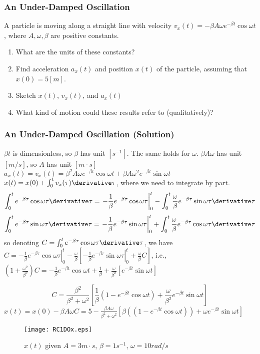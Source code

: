 \begin{frame}
\frametitle{An Under-Damped Oscillation}
A particle is moving along a \alert{straight} line with velocity $v_x(t)=-\beta A\omega e^{-\beta t}\cos\omega t$, where $A,\omega,\beta$ are \alert{positive} constants.
\begin{enumerate}
\item{What are the \alert{units} of these constants?}
\item{Find \alert{acceleration} $a_x(t)$ and \alert{position} $x(t)$ of the particle, assuming that $x(0)=5\unit{[m]}$.}
\item{Sketch $x(t)$, $v_x(t)$, and $a_x(t)$}
\item{What kind of motion could these results refer to (qualitatively)?}
\end{enumerate}
\end{frame}
\begin{frame}
\frametitle{An Under-Damped Oscillation (Solution)}
$\beta t$ is \alert{dimensionless}, so $\beta$ has unit $[s^{-1}]$. The same holds for $\omega$. $\beta A\omega$ has unit $[m/s]$, so $A$ has unit $[m\cdot s]$\\$a_x(t)=\dot v_x(t)=\beta^2 A\omega e^{-\beta t}\cos\omega t+\beta A\omega^2 e^{-\beta t}\sin\omega t$\\$x(t)=x(0)+\int_0^t v_x(\tau)\derivative\tau$, where we need to \alert{integrate by part}.
\[
\int_0^t e^{-\beta \tau}\cos\omega \tau\derivative\tau=\left.-\frac{1}{\beta}e^{-\beta\tau}\cos\omega\tau\right|_0^t-\int_0^t\frac{\omega}{\beta}e^{-\beta\tau}\sin\omega\tau\derivative\tau
\]
\[
\int_0^t e^{-\beta \tau}\sin\omega \tau\derivative\tau=\left.-\frac{1}{\beta}e^{-\beta\tau}\sin\omega\tau\right|_0^t+\int_0^t\frac{\omega}{\beta}e^{-\beta\tau}\cos\omega\tau\derivative\tau
\]
so denoting $C=\int_0^t e^{-\beta \tau}\cos\omega \tau\derivative\tau$, we have $C=\left.-\frac{1}{\beta}e^{-\beta\tau}\cos\omega\tau\right|_0^t-\frac{\omega}{\beta}[\left.-\frac{1}{\beta}e^{-\beta\tau}\sin\omega\tau\right|_0^t+\frac{\omega}{\beta}C]$, i.e., \\$(1+\frac{\omega^2}{\beta^2})C=-\frac{1}{\beta}e^{-\beta t}\cos\omega t+\frac{1}{\beta}+\frac{\omega}{\beta^2}[e^{-\beta t}\sin\omega t]$
\end{frame}
\begin{frame}
\[C=\frac{\beta^2}{\beta^2+\omega^2}\left[\frac{1}{\beta}(1-e^{-\beta t}\cos\omega t)+\frac{\omega}{\beta^2}e^{-\beta t}\sin\omega t\right]\]
$x(t)=x(0)-\beta A\omega C=5-\frac{\beta A\omega}{\beta^2+\omega^2}\left[\beta((1-e^{-\beta t}\cos\omega t))+\omega e^{-\beta t}\sin\omega t\right]$
\begin{figure}[H]
\centering
\texttt{[image: RC1DOx.eps]}
\caption{$x(t)$ given $A=3\unit{m\cdot s}$, $\beta=1\unit{s^{-1}}$, $\omega=10\unit{rad/s}$}
\end{figure}
\end{frame}
